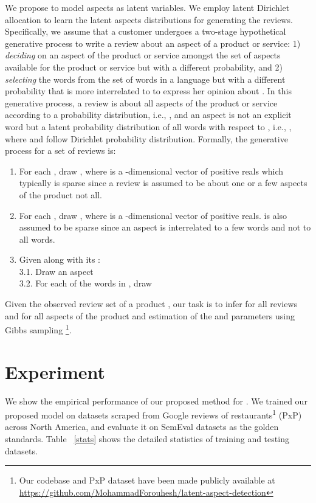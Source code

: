 \documentclass[11pt]{article}
\begin{document}
We propose to model aspects as latent variables. We employ latent Dirichlet allocation to learn the latent aspects distributions for generating the reviews. Specifically, we assume that a customer undergoes a two-stage hypothetical generative process to write a review about an aspect of a product or service: 1) \textit{deciding} on an aspect  of the product or service amongst the set of aspects available for the product or service  but with a different probability, and 2) \textit{selecting} the words from the set  of words in a language but with a different probability that is more interrelated to  to express her opinion about . In this generative process, a review is about all aspects of the product or service according to a probability distribution, i.e., , and an aspect  is not an explicit word but a latent probability distribution of all words with respect to , i.e., , where  and  follow Dirichlet probability distribution. Formally, the generative process for a set of reviews  is:
\begin{enumerate}\item For each , draw , where  is a -dimensional vector of positive reals which typically is sparse since a review is assumed to be about one or a few aspects of the product not all.
    \item For each , draw , where  is a -dimensional vector of positive reals.  is also assumed to be sparse since an aspect is interrelated to a few words and not to all words. 
    \item Given  along with its :\\
 3.1. Draw an aspect  \\
 3.2. For each of the words  in , draw    \\ 
\end{enumerate}
Given the observed review set of a product , our task is to infer  for all reviews  and  for all aspects  of the product and estimation of the  and  parameters using Gibbs sampling \cite{XiaoS_2010}\footnote{Our codebase and PxP dataset have been made publicly available at \href{https://github.com/MohammadForouhesh/latent-aspect-detection}{https://github.com/MohammadForouhesh/latent-aspect-detection}}.

\section{Experiment}
We show the empirical performance of our proposed method for . We trained our proposed model on datasets scraped from Google reviews of restaurants\textsuperscript{1} (PxP) across North America, and evaluate it on SemEval datasets \cite{Pontiki_2014,Pontiki_2015,Pontiki_2016} as the golden standards. Table ~\ref{stats} shows the detailed statistics of training and testing datasets.
\end{document}
